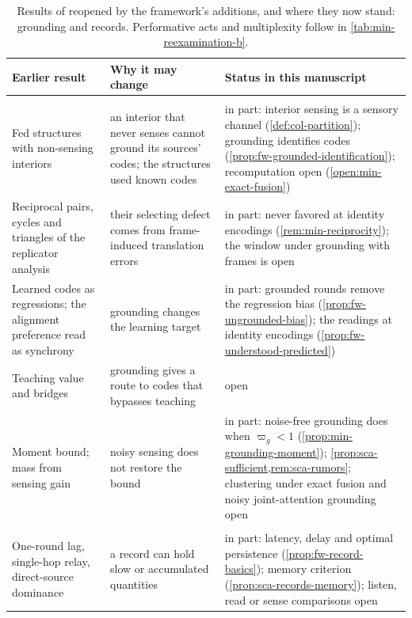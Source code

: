 \begin{table}[tp]
\centering\footnotesize
\caption{Results of \citet{dennis2026communicating} reopened by the framework's additions, and where they now stand: grounding and records. Performative acts and multiplexity follow in \cref{tab:min-reexamination-b}.}\label{tab:min-reexamination}
\begin{tabular}{@{}>{\raggedright\arraybackslash}p{}>{\raggedright\arraybackslash}p{}>{\raggedright\arraybackslash}p{}@{}}
\toprule
Earlier result & Why it may change & Status in this manuscript \\
\midrule
\multicolumn{3}{@{}l}{\emph{Grounding}} \\
Fed structures with non-sensing interiors & an interior that never senses cannot ground its sources' codes; the structures used known codes & in part: interior sensing is a sensory channel (\cref{def:col-partition}); grounding identifies codes (\cref{prop:fw-grounded-identification}); recomputation open (\cref{open:min-exact-fusion}) \\
Reciprocal pairs, cycles and triangles of the replicator analysis & their selecting defect comes from frame-induced translation errors & in part: never favored at identity encodings (\cref{rem:min-reciprocity}); the window under grounding with frames is open \\
Learned codes as regressions; the alignment preference read as synchrony & grounding changes the learning target & in part: grounded rounds remove the regression bias (\cref{prop:fw-ungrounded-bias}); the readings at identity encodings (\cref{prop:fw-understood-predicted}) \\
Teaching value and bridges & grounding gives a route to codes that bypasses teaching & open \\
Moment bound; mass from sensing gain & noisy sensing does not restore the bound & in part: noise-free grounding does when $\varpi_g<1$ (\cref{prop:min-grounding-moment}); \cref{prop:sca-sufficient,rem:sca-rumors}; clustering under exact fusion and noisy joint-attention grounding open \\
\multicolumn{3}{@{}l}{\emph{Records}} \\
One-round lag, single-hop relay, direct-source dominance & a record can hold slow or accumulated quantities & in part: latency, delay and optimal persistence (\cref{prop:fw-record-basics}); memory criterion (\cref{prop:sca-records-memory}); listen, read or sense comparisons open \\

\end{tabular}
\end{table}
